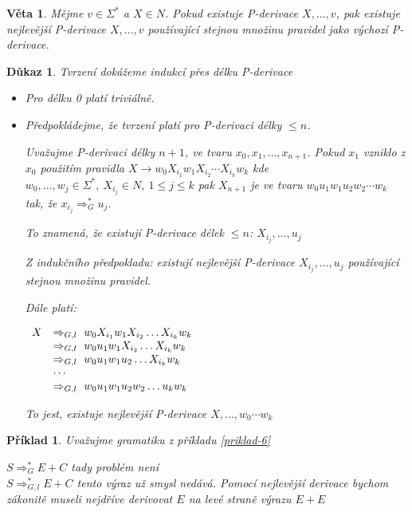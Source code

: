 \documentclass[10pt, a4paper, titlepage]{article}
\theoremstyle{note}
\newtheorem{veta}{Věta}
\newtheorem{dukaz}{Důkaz}
\newtheorem{priklad}{Příklad}
\begin{document}
\begin{veta}
Mějme $v \in \Sigma^*$ a $X \in N$. Pokud existuje P-derivace $X,\ldots,v$, pak existuje nejlevější P-derivace $X,\ldots,v$ používající stejnou množinu pravidel jako výchozí P-derivace.
\end{veta}
\begin{dukaz}
Tvrzení dokážeme indukcí přes délku P-derivace
\begin{itemize}
\item
Pro délku 0 platí triviálně.
\item
Předpokládejme, že tvrzení platí pro P-derivaci délky $\le n$.

Uvažujme P-derivaci délky $n+1$, ve tvaru $x_0,x_1,\ldots,x_{n+1}$. Pokud $x_1$ vzniklo z $x_0$ použitím pravidla $X \rightarrow w_0X_{i_1}w_1X_{i_2} \cdots X_{i_k}w_k$ kde $w_0,\ldots,w_j \in \Sigma^*,\ X_{i_j} \in N,\ 1 \le j\le k$ pak $X_{n+1}$ je ve tvaru $w_0u_1w_1u_2w_2 \cdots w_k$ tak, že $x_{i_j} \Rightarrow_G^* u_j$.

To znamená, že existují P-derivace délek $\le n$: $X_{i_j},\ldots,u_j$

Z indukčního předpokladu: existují nejlevější P-derivace $X_{i_j},\ldots,u_j$ používající stejnou množinu pravidel.

Dále platí: 

$
\begin{array}{l l}
X & \Rightarrow_{G,l}\  w_0X_{i_1}w_1X_{i_2} \ldots X_{i_k}w_k \\
& \Rightarrow_{G,l}\  w_0u_1w_1X_{i_2} \ldots X_{i_k}w_k \\
& \Rightarrow_{G,l}\  w_0u_1w_1u_2 \ldots X_{i_k}w_k \\
& \cdots \\
& \Rightarrow_{G,l}\  w_0u_1w_1u_2w_2 \ldots u_kw_k
\end{array}
$

To jest, existuje nejlevější P-derivace $X,\ldots,w_0 \cdots w_k$
\end{itemize}
\end{dukaz}

\begin{priklad}
Uvažujme gramatiku z příkladu \ref{priklad-6}

$S \Rightarrow_G^* E+C$ tady problém není\\
$S \Rightarrow_{G,l}^* E+C$ tento výraz už smysl nedává. Pomocí nejlevější derivace bychom zákonitě museli nejdříve derivovat $E$ na levé straně výrazu $E+E$
\end{priklad}
\end{document}

